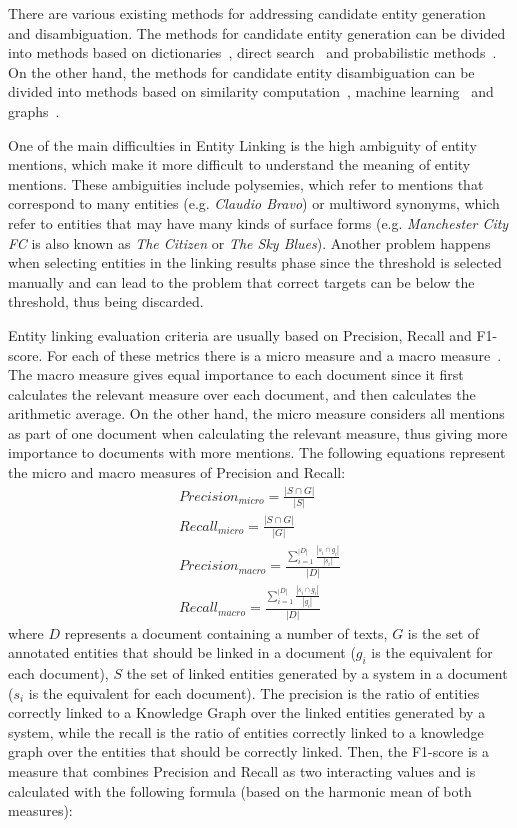 There are various existing methods for addressing candidate entity generation and 
disambiguation. The methods for candidate entity generation can be divided into methods 
based on dictionaries~\cite{infExtr:ZhangSTW10, infExtr:HanSZ11}, 
direct search~\cite{infExtr:McNameeMLOD11, infExtr:DredzeMRGF10} and 
probabilistic methods~\cite{infExtr:ganea2016, infExtr:PanCHJK15}. On the other hand, the 
methods for candidate entity disambiguation can be divided into methods based on 
similarity computation~\cite{infExtr:Cucerzan07, infExtr:BunescuP06}, 
machine learning~\cite{infExtr:ganea2016, infExtr:ZhangSTW10} 
and graphs~\cite{infExtr:GongFLSH17, infExtr:HanSZ11}.

One of the main difficulties in Entity Linking is the high ambiguity of entity mentions, 
which make it more difficult to understand the meaning of entity mentions. These ambiguities 
include polysemies, which refer to mentions that correspond to many entities (e.g. 
\textit{Claudio Bravo}) or multiword synonyms, which refer to entities that may have many 
kinds of surface forms (e.g. \textit{Manchester City FC} is also known as \textit{The Citizen} 
or \textit{The Sky Blues}). Another problem happens when selecting entities in the linking 
results phase since the threshold is selected manually and can lead to the problem that 
correct targets can be below the threshold, thus being discarded.

Entity linking evaluation criteria are usually based on Precision, Recall and 
F1-score. For each of these metrics there is a micro measure and a macro 
measure~\cite{entlin:CornoltiFC13}. The macro measure gives equal importance to each 
document since it first calculates the relevant measure over each document, and then 
calculates the arithmetic average. On the other hand, the micro measure considers all 
mentions as part of one document when calculating the relevant measure, thus giving more 
importance to documents with more mentions. The following equations represent the micro and 
macro measures of Precision and Recall:
\begin{align*} 
    Precision_{micro} = \frac{|S \cap G|}{|S|} \\
    Recall_{micro} = \frac{|S \cap G|}{|G|} \\
    Precision_{macro} = \frac{\sum_{i=1}^{|D|} \frac{|s_i \cap g_i |}{|s_i|}}{|D|} \\
    Recall_{macro} = \frac{\sum_{i=1}^{|D|} \frac{|s_i \cap g_i |}{|g_i|}}{|D|}
\end{align*}
\noindent where $D$ represents a document containing a number of texts, $G$ is the set of annotated 
entities that should be linked in a document ($g_i$ is the equivalent for each document), 
$S$ the set of linked entities generated by a system in a document ($s_i$ is the equivalent 
for each document). The precision is the ratio of entities correctly linked to a Knowledge 
Graph over the linked entities generated by a system, while the recall is the ratio of 
entities correctly linked to a knowledge graph over the entities that should be correctly 
linked. Then, the F1-score is a measure that combines Precision and Recall as two 
interacting values and is calculated with the following formula (based on the harmonic 
mean of both measures):

